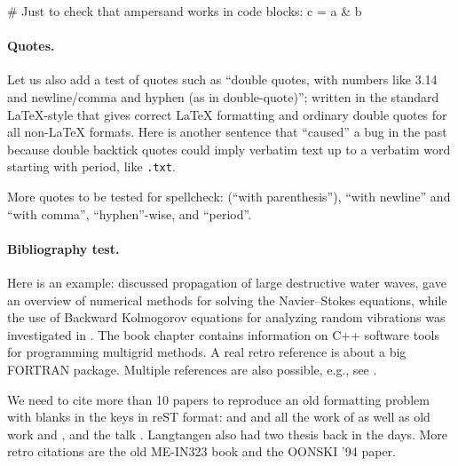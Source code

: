 \documentclass[%
oneside,                 %
final,                   %
10pt]{article}
\theoremstyle{definition}
\begin{document}
\begin{enumerate}
\bdat
# Just to check that ampersand works in code blocks:
c = a & b

\edat


\paragraph{Quotes.}
Let us also add a test of quotes such as ``double quotes, with numbers
like 3.14 and newline/comma and hyphen (as in double-quote)''; written
in the standard LaTeX-style that gives correct {\LaTeX} formatting and
ordinary double quotes for all non-LaTeX formats.  Here is another
sentence that ``caused'' a bug in the past because double backtick
quotes could imply verbatim text up to a verbatim word starting with
period, like \texttt{.txt}.

More quotes to be tested for spellcheck:
(``with parenthesis''), ``with newline''
and ``with comma'', ``hyphen''-wise, and ``period''.

\paragraph{Bibliography test.}
Here is an example: \cite{Langtangen_Pedersen_2002} discussed propagation of
large destructive water waves, \cite{Langtangen_et_al_2002} gave
an overview of numerical methods for solving the Navier--Stokes equations,
while the use of Backward Kolmogorov equations for analyzing
random vibrations was investigated in \cite{Langtangen_1994a}.
The book chapter \cite{Mardal_et_al_2003a} contains information on
C++ software tools for programming multigrid methods. A real retro
reference is \cite{Langtangen_1988d} about a big FORTRAN package.
Multiple references are also possible, e.g., see
\cite{Langtangen_Pedersen_2002,Mardal_et_al_2003a}.

We need to cite more than 10 papers to reproduce an old formatting
problem with blanks in the keys in reST format:
\cite{Langtangen_1992c,Langtangen_1994a,Mortensen_et_al_2011,Langtangen_Pedersen_2002}
and
\cite{Langtangen_et_al_2002,Glimsdal_et_al_20006,Rahman_et_al_2006b,Haga_et_al_2011a,Langtangen_2003a,Langtangen_2008a,Langtangen:95}
and all the work of
\cite{Langtangen_2012,Mardal_et_al_2003a,Jeberg_et_al_2004} as well as
old work \cite{Langtangen_1988d} and \cite{Langtangen_1989e}, and the
talk \cite{Langtangen_talk_2007a}.
Langtangen also had two thesis \cite{Langtangen:85,Langtangen_1989e}
back in the days.
More retro citations are
the old ME-IN323 book \cite{Langtangen:91} and the
\cite{Langtangen:94b} OONSKI '94 paper.


\end{enumerate}
\end{document}
